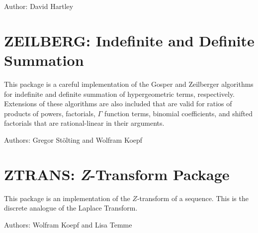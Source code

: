 Author: David Hartley



\newpage

\section{ZEILBERG: Indefinite and Definite Summation}


This package is a careful implementation of the Gosper and Zeilberger
algorithms for indefinite and definite summation of hypergeometric terms,
respectively.  Extensions of these algorithms are also included that are
valid for ratios of products of powers, factorials, $\Gamma$ function
terms, binomial coefficients, and shifted factorials that are
rational-linear in their arguments.

Authors: Gregor St\"olting and Wolfram Koepf



\newpage

\section{ZTRANS: \textit{Z}-Transform Package}


This package is an implementation of the $Z$-transform of a sequence.
This is the discrete analogue of the Laplace Transform.

Authors: Wolfram Koepf and Lisa Temme



\let\sectionmark=\origsectionmark
